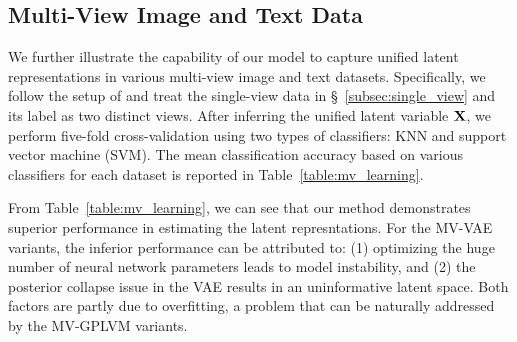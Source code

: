 
\vspace{-0.09in}
\subsection{Multi-View Image and Text Data}
\vspace{-0.09in}
\label{subsec: image_text_data}
We further illustrate the capability of our model to capture unified latent representations in various multi-view image and text datasets. Specifically, we follow the setup of \citet{wu2018multimodal} and treat the single-view data in \S~\ref{subsec:single_view} and its label as two distinct views. %
 After inferring the unified latent variable ${\mathbf X}$, we perform five-fold cross-validation using two types of classifiers: KNN and support vector machine (\MakeUppercase{svm}). The mean classification accuracy based on various classifiers for each dataset is reported in Table~\ref{table:mv_learning}. 

From Table~\ref{table:mv_learning}, we can see that our method demonstrates superior performance in estimating the %
latent represntations. For the MV-VAE variants, the %
inferior performance can be attributed to: (1) optimizing the huge number of neural network parameters leads to model instability, and (2) the posterior collapse issue in the \MakeUppercase{vae} results in an uninformative latent space. %
Both factors are partly due to overfitting, a problem that can be naturally addressed by the MV-GPLVM variants.

